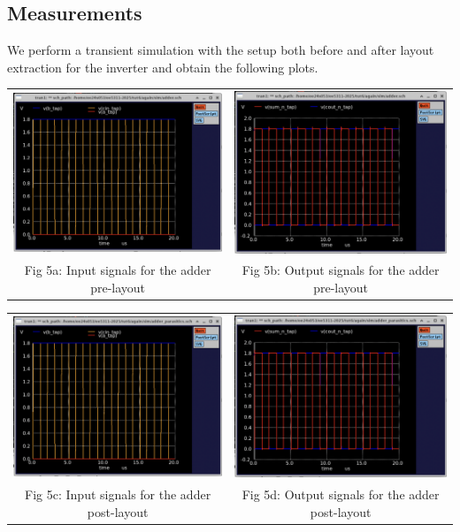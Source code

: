 \documentclass[12pt,a4paper]{article}
\begin{document}
\subsection{Measurements}
\noindent We perform a transient simulation with the setup both before and after layout extraction for the inverter and obtain the following plots.
\begin{center}
\begin{tabular}{cc}
     \includegraphics[width=0.47\linewidth]{tut6/reports/media/adder_inputs.png} &
     \includegraphics[width=0.47\linewidth]{tut6/reports/media/adder_outputs.png} \\
     Fig 5a: Input signals for the adder pre-layout & Fig 5b: Output signals for the adder pre-layout
\end{tabular}
\begin{tabular}{cc}
     \includegraphics[width=0.47\linewidth]{tut6/reports/media/adder_parasitics_inputs.png} &
     \includegraphics[width=0.47\linewidth]{tut6/reports/media/adder_parasitics_outputs.png} \\
     Fig 5c: Input signals for the adder post-layout & Fig 5d: Output signals for the adder post-layout
\end{tabular}
\end{center}
\end{document}
